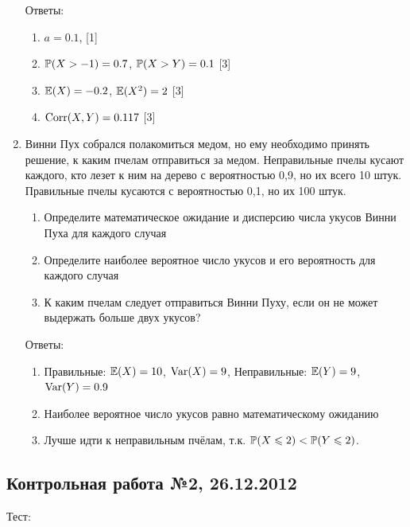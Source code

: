 \documentclass[12pt, a4paper]{article}\usepackage[]{graphicx}\usepackage[]{color}
\begin{document}
\begin{enumerate}
					Ответы:
					\begin{enumerate}
						\item $a=0.1$, [1]
						\item $\P(X>-1)=0.7$, $\P(X>Y)=0.1$ [3]
						\item $\E(X)=-0.2$, $\E(X^2)=2$ [3]
						\item $\Corr(X,Y)=0.117$ [3]
					\end{enumerate}

					\item Винни Пух собрался полакомиться медом, но ему необходимо принять решение, к каким пчелам отправиться за медом. Неправильные пчелы кусают каждого, кто лезет к ним на дерево с вероятностью 0,9, но их всего 10 штук. Правильные пчелы кусаются с вероятностью 0,1, но их 100 штук.
					\begin{enumerate}
						\item  Определите математическое ожидание и дисперсию числа укусов Винни Пуха для каждого случая
						\item Определите наиболее вероятное число укусов и его вероятность для каждого случая
						\item К каким пчелам следует отправиться Винни Пуху, если он не может выдержать больше двух укусов?
					\end{enumerate}

					Ответы:
					\begin{enumerate}
						\item Правильные: $\E(X)=10$, $\Var(X)=9$, Неправильные: $\E(Y)=9$, $\Var(Y)=0.9$
						\item Наиболее вероятное число укусов равно математическому ожиданию
						\item Лучше идти к неправильным пчёлам, т.к. $\P(X\leq 2)<\P(Y\leq 2)$.
					\end{enumerate}

				\end{enumerate}

				\subsection{Контрольная работа №2, 26.12.2012}

				Тест:
\end{document}
